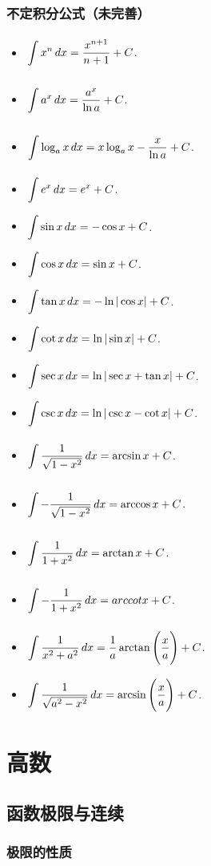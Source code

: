 \documentclass[a4paper,12pt,oneside,fontset=none]{ctexbook}
\let\olddfrac\dfrac
\renewcommand{\dfrac}[2]{
    \olddfrac{#1\vrule width 0pt height 1.15em depth 0em}{#2\vrule width 0pt height 0em depth 0.6em}
}
\let\oldint\int
\renewcommand{\int}{\displaystyle{\vrule width 0pt height 0em depth 0em}\oldint}
\numberwithin{equation}{chapter}
\begin{document}
\section{不定积分公式（未完善）}
\begin{itemize}
    \item $\int x^n \,dx = \dfrac{x^{n+1}}{n+1} + C$.
    \item $\int a^x \,dx = \dfrac{a^x}{\ln a} + C$.
    \item $\int \log_a x \,dx = x \log_a x - \dfrac{x}{\ln a} + C$.
    \item $\int e^x \,dx = e^x + C$.
    \item $\int \sin x \,dx = -\cos x + C$.
    \item $\int \cos x \,dx = \sin x + C$.
    \item $\int \tan x \,dx = -\ln|\cos x| + C$.
    \item $\int \cot x \,dx = \ln|\sin x| + C$.
    \item $\int \sec x \,dx = \ln|\sec x + \tan x| + C$.
    \item $\int \csc x \,dx = \ln|\csc x - \cot x| + C$.
    \item $\int \dfrac{1}{\sqrt{1 - x^2}} \,dx = \arcsin x + C$.
    \item $\int -\dfrac{1}{\sqrt{1 - x^2}} \,dx = \arccos x + C$.
    \item $\int \dfrac{1}{1 + x^2} \,dx = \arctan x + C$.
    \item $\int -\dfrac{1}{1 + x^2} \,dx = arccot x + C$.
    \item $\int \dfrac{1}{x^2 + a^2} \,dx = \dfrac{1}{a} \arctan\left(\dfrac{x}{a}\right) + C$.
    \item $\int \dfrac{1}{\sqrt{a^2 - x^2}} \,dx = \arcsin\left(\dfrac{x}{a}\right) + C$.
    
\end{itemize}


\part{高数}
\chapter{函数极限与连续}

\section{极限的性质}
\end{document}
